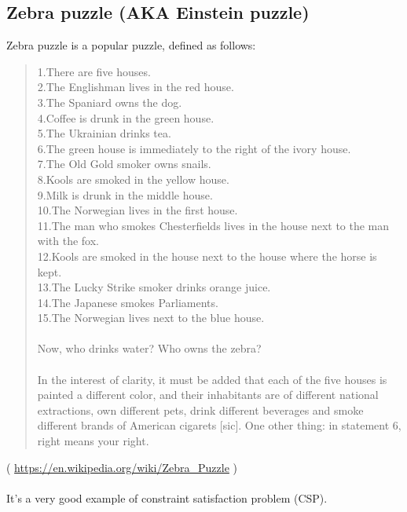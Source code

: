 \subsection{Zebra puzzle (AKA Einstein puzzle)} %

Zebra puzzle is a popular puzzle, defined as follows:

\begin{framed}
\begin{quotation}
1.There are five houses.\\
2.The Englishman lives in the red house.\\
3.The Spaniard owns the dog.\\
4.Coffee is drunk in the green house.\\
5.The Ukrainian drinks tea.\\
6.The green house is immediately to the right of the ivory house.\\
7.The Old Gold smoker owns snails.\\
8.Kools are smoked in the yellow house.\\
9.Milk is drunk in the middle house.\\
10.The Norwegian lives in the first house.\\
11.The man who smokes Chesterfields lives in the house next to the man with the fox.\\
12.Kools are smoked in the house next to the house where the horse is kept.\\
13.The Lucky Strike smoker drinks orange juice.\\
14.The Japanese smokes Parliaments.\\
15.The Norwegian lives next to the blue house.\\
\\
Now, who drinks water? Who owns the zebra?\\
\\
In the interest of clarity, it must be added that each of the five houses is painted a different color, and their inhabitants are of different national extractions, own different pets, drink different beverages and smoke different brands of American cigarets [sic]. One other thing: in statement 6, right means your right.
\end{quotation}
\end{framed}
( \url{https://en.wikipedia.org/wiki/Zebra_Puzzle} ) \\
\\
It's a very good example of constraint satisfaction problem (CSP). %

